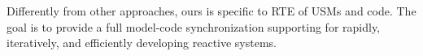 



Differently from other approaches, ours is specific to RTE of USMs and code. The goal is to provide a full model-code synchronization supporting for rapidly, iteratively, and efficiently developing reactive systems. 